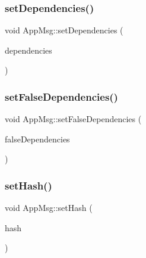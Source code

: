 \subsubsection{\texorpdfstring{set\+Dependencies()}{setDependencies()}}
{\footnotesize\ttfamily void App\+Msg\+::set\+Dependencies (\begin{DoxyParamCaption}\item[{const \hyperlink{_app_msg__m_8h_a39bb58326d7e24febcd7397c022ada6a}{App\+Msg\+Dep} \&}]{dependencies }\end{DoxyParamCaption})\hspace{0.3cm}{\ttfamily [virtual]}}

\mbox{\label{class_app_msg_ab810112cdc978f6c93b2d45e4aa6f094}} 
\subsubsection{\texorpdfstring{set\+False\+Dependencies()}{setFalseDependencies()}}
{\footnotesize\ttfamily void App\+Msg\+::set\+False\+Dependencies (\begin{DoxyParamCaption}\item[{const \hyperlink{_app_msg__m_8h_a2b8cadfd13c916ddccf5a213ca34d8ee}{App\+Msg\+False\+Dep} \&}]{false\+Dependencies }\end{DoxyParamCaption})\hspace{0.3cm}{\ttfamily [virtual]}}

\mbox{\label{class_app_msg_afd406d5bf0b92892a1ebf8fe3397331a}} 
\subsubsection{\texorpdfstring{set\+Hash()}{setHash()}}
{\footnotesize\ttfamily void App\+Msg\+::set\+Hash (\begin{DoxyParamCaption}\item[{unsigned long}]{hash }\end{DoxyParamCaption})\hspace{0.3cm}{\ttfamily [virtual]}}

\mbox{\label{class_app_msg_ac76f921f7a873b5ca4b944fbbacfdf1c}} 
